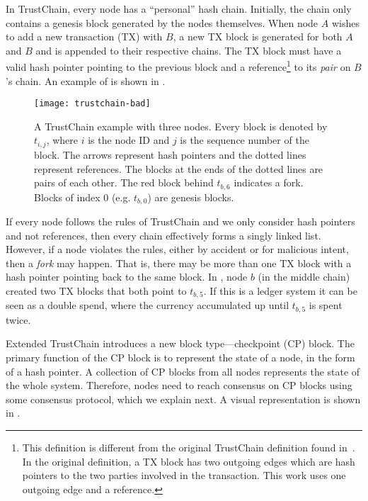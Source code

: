 In TrustChain, every node has a ``personal'' hash chain. 
Initially, the chain only contains a genesis block generated by the nodes themselves.
When node $A$ wishes to add a new transaction (TX) with $B$,
a new TX block is generated for both $A$ and $B$ and is appended to their respective chains.
The TX block must have a valid hash pointer pointing to the previous block and a reference\footnote{This definition is different from the original TrustChain definition found in~\cite{multichain}.
    In the original definition, a TX block has two outgoing edges which are hash pointers to the two parties involved in the transaction.
    This work uses one outgoing edge and a reference.} to its \emph{pair} on $B$'s chain.
An example of is shown in .

\begin{figure}
    \texttt{[image: trustchain-bad]}
    \centering
    \caption{
    A TrustChain example with three nodes.
    Every block is denoted by $t_{i,j}$, where $i$ is the node ID and $j$ is the sequence number of the block.
    The arrows represent hash pointers and the dotted lines represent references.
    The blocks at the ends of the dotted lines are pairs of each other.
    The red block behind $t_{b, 6}$ indicates a fork.
    Blocks of index 0 (e.g. $t_{b, 0}$) are genesis blocks.}
    \label{fig:trustchain-bad}
\end{figure}

If every node follows the rules of TrustChain and we only consider hash pointers and not references,
then every chain effectively forms a singly linked list.
However, if a node violates the rules,
either by accident or for malicious intent,
then a \emph{fork} may happen.
That is, there may be more than one TX block with a hash pointer pointing back to the same block.
In , node $b$ (in the middle chain) created two TX blocks that both point to $t_{b, 5}$.
If this is a ledger system it can be seen as a double spend, where the currency accumulated up until $t_{b, 5}$ is spent twice.

Extended TrustChain introduces a new block type---checkpoint (CP) block.
The primary function of the CP block is to represent the state of a node, in the form of a hash pointer.
A collection of CP blocks from all nodes represents the state of the whole system.
Therefore, nodes need to reach consensus on CP blocks using some consensus protocol, which we explain next.
A visual representation is shown in .


